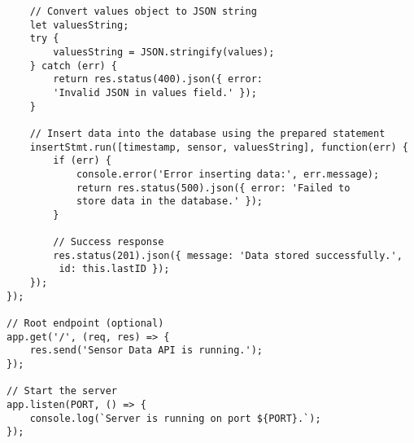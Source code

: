 \begin{verbatim}
    // Convert values object to JSON string
    let valuesString;
    try {
        valuesString = JSON.stringify(values);
    } catch (err) {
        return res.status(400).json({ error: 
        'Invalid JSON in values field.' });
    }

    // Insert data into the database using the prepared statement
    insertStmt.run([timestamp, sensor, valuesString], function(err) {
        if (err) {
            console.error('Error inserting data:', err.message);
            return res.status(500).json({ error: 'Failed to 
            store data in the database.' });
        }

        // Success response
        res.status(201).json({ message: 'Data stored successfully.',
         id: this.lastID });
    });
});

// Root endpoint (optional)
app.get('/', (req, res) => {
    res.send('Sensor Data API is running.');
});

// Start the server
app.listen(PORT, () => {
    console.log(`Server is running on port ${PORT}.`);
});

\end{verbatim}
